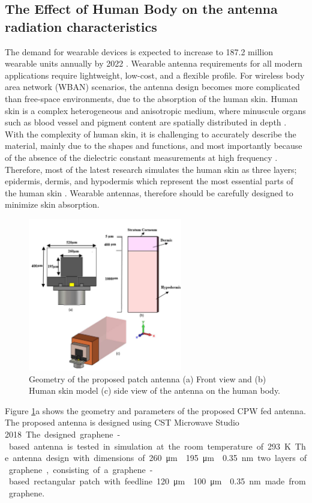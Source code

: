\documentclass[12pt]{suhbook}
\begin{document}
\subsection{The Effect of Human Body on the antenna radiation characteristics}
% 
% 
The demand for wearable devices is expected to increase to \num{187.2}  million wearable units annually by \num{2022} \cite{hernandez2019wearable}. Wearable antenna requirements for all modern applications require lightweight, low-cost, and a flexible profile. For wireless body area network (WBAN) scenarios, the antenna design becomes more complicated than free-space environments, due to the absorption of the human skin. Human skin is a complex heterogeneous and anisotropic medium, where minuscule organs such as blood vessel and pigment content are spatially distributed in depth \cite{flynn2011modeling}. With the complexity of human skin, it is challenging to accurately describe the material, mainly due to the shapes and functions, and most importantly because of the absence of the dielectric constant measurements at high frequency \cite{alekseev2007human}. Therefore, most of the latest research simulates the human skin as three layers; epidermis, dermis, and hypodermis which represent the most essential parts of the human skin \cite{lynch1989growth}. Wearable antennas, therefore should be carefully designed to minimize skin absorption.
% 
\begin{figure}[hbt!]
\centering
\includegraphics[width=0.6\textwidth]{8}
\caption{Geometry of the proposed patch antenna (a) Front view and (b) Human skin model (c) side view of the antenna on the human body.}
\label{Fig 8}
\end{figure}
% 
Figure \ref{Fig 8}a shows the geometry and parameters of the proposed CPW fed antenna. The proposed antenna is designed using CST Microwave Studio \SI{2018}. The designed graphene-based antenna is tested in simulation at the room temperature of \SI{293}{\kelvin}. The antenna design with dimensions of \SI{260}{\um} \times\SI{195}{\um} \times \SI{0.35}{\nm} two layers of graphene,consisting of a graphene-based rectangular patch with feedline \SI{120}{\um} \times \SI{100}{\um} \times \SI{0.35}{\nm} made from graphene.
\end{document}

